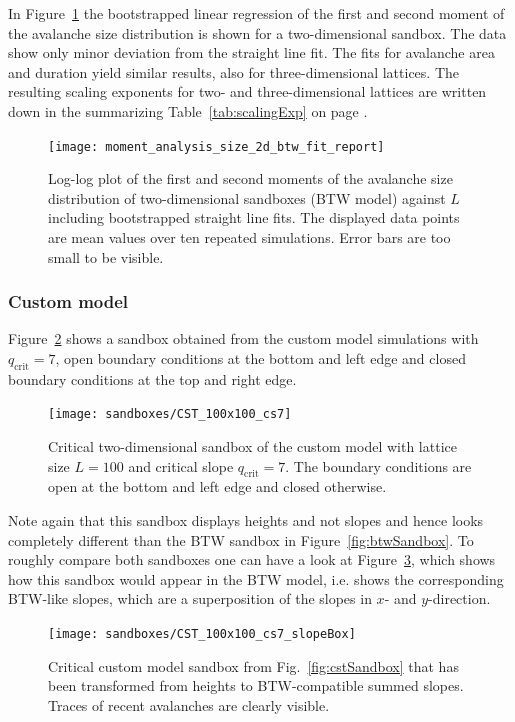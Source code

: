 In Figure~\ref{fig:btwSizeFit} the bootstrapped linear regression of the first and second moment of the avalanche size
distribution is shown for a two-dimensional sandbox. The data show only minor deviation from the straight line fit.
The fits for avalanche area and duration yield similar results, also for three-dimensional lattices.
The resulting scaling exponents for two- and three-dimensional lattices are written down in the summarizing
Table~\ref{tab:scalingExp} on page \pageref{tab:scalingExp}.
\begin{figure}[htb]
    \centering
    \texttt{[image: moment\_analysis\_size\_2d\_btw\_fit\_report]}
    \caption{Log-log plot of the first and second moments of the avalanche size distribution of two-dimensional
             sandboxes (BTW model) against $L$ including bootstrapped straight line fits.
             The displayed data points are mean values over ten repeated simulations.
             Error bars are too small to be visible.}
    \label{fig:btwSizeFit}
\end{figure}

\subsubsection{Custom model}
Figure~\ref{fig:customSandbox} shows a sandbox obtained from the custom model simulations with $q_{\mathrm{crit}}=7$,
open boundary conditions at the bottom and left edge and closed boundary conditions at the top and right edge.
\begin{figure}[htb]
    \centering
    \texttt{[image: sandboxes/CST\_100x100\_cs7]}
    \caption{Critical two-dimensional sandbox of the custom model with lattice size $L=100$ and
             critical slope $q_{\mathrm{crit}}=7$.
             The boundary conditions are open at the bottom and left edge and closed otherwise.}
    \label{fig:customSandbox}
\end{figure}

Note again that this sandbox displays heights and not slopes and hence looks completely different than the BTW sandbox
in Figure~\ref{fig:btwSandbox}. To roughly compare both sandboxes one can have a look at Figure~\ref{fig:cstSlopebox},
which shows how this sandbox would appear in the BTW model, i.e. shows the corresponding BTW-like slopes, which are
a superposition of the slopes in $x$- and $y$-direction.
\begin{figure}[htb]
    \centering
    \texttt{[image: sandboxes/CST\_100x100\_cs7\_slopeBox]}
    \caption{Critical custom model sandbox from Fig.~\ref{fig:cstSandbox} that has been transformed from heights to
             BTW-compatible summed slopes. Traces of recent avalanches are clearly visible.}
    \label{fig:cstSlopebox}
\end{figure}

